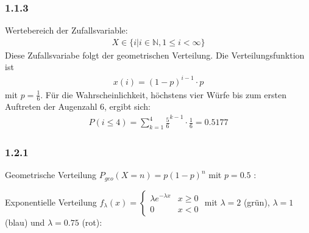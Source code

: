 \subsubsection*{1.1.3}
Wertebereich der Zufallsvariable:
\begin{align*}
X \in \{i | i\in\mathbb{N}, 1 \leq i < \infty \}
\end{align*}
Diese Zufallsvariabe folgt der geometrischen Verteilung. Die Verteilungsfunktion ist
\begin{align*}
x(i) = (1-p)^{i-1} \cdot p
\end{align*}
mit $p=\frac{1}{6}$.
Für die Wahrscheinlichkeit, höchstens vier Würfe bis zum ersten Auftreten der Augenzahl 6, ergibt sich:
\begin{align*}
P(i \leq 4 ) = \sum_{k=1}^4 \frac{5}{6}^{k-1} \cdot \frac{1}{6} = 0.5177
\end{align*}
\subsubsection*{1.2.1}
Geometrische Verteilung $P_{geo}(X=n)=p (1-p)^{n}$ mit $p = 0.5$ :

\begin{center}
\end{center}
\vspace{0.5cm}
Exponentielle Verteilung $f_{\lambda}(x) = \begin{cases} \lambda e^{-\lambda x} & x \geq 0 \\ 0 & x < 0\end{cases}$ mit $\lambda = 2$ (grün), $\lambda = 1$ (blau) und $\lambda = 0.75$ (rot):
\begin{center}
\vspace{0.5cm}
\end{center}

